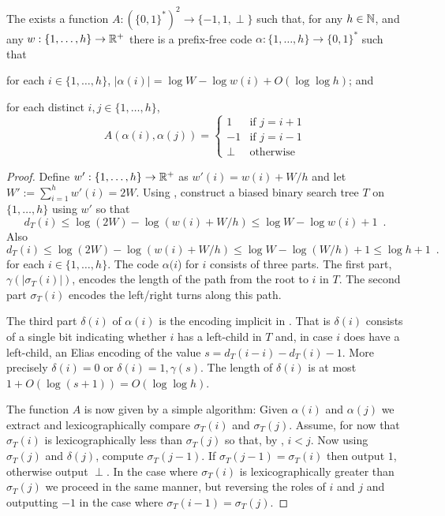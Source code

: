 \documentclass[kpfonts]{patmorin}
\begin{document}
\begin{lem}
  The exists a function $A:(\{0,1\}^*)^2\to\{-1,1,\perp\}$ such that, for any $h\in\mathbb{N}$, and any $w:\{1,\ldots,h\}\to\mathbb{R}^+$ there is a prefix-free code $\alpha:\{1,\ldots,h\}\to \{0,1\}^*$ such that 
  \begin{compactenum}
    \item for each $i\in\{1,\ldots,h\}$, $|\alpha(i)|=\log W -\log w(i) + O(\log\log h)$; and
    \item for each distinct $i,j\in\{1,\ldots,h\}$, 
    \[   A(\alpha(i),\alpha(j)) 
    = \begin{cases}
       1 & \text{if $j=i+1$} \\
       -1 & \text{if $j=i-1$} \\
       \perp & \text{otherwise}
      \end{cases}
      \]
    \end{compactenum}
\end{lem}


\begin{proof}
  Define $w':\{1,\ldots,h\}\to \mathbb{R}^+$ as $w'(i)=w(i)+W/h$ and let $W':=\sum_{i=1}^h w'(i)=2W$.
  Using , construct a biased binary search tree $T$ on $\{1,\ldots,h\}$ using $w'$ so that 
  \[   
    d_T(i)\le\log (2W)-\log(w(i)+W/h) \le \log W-\log w(i)+1 \enspace .
  \]
  Also
  \[
  d_T(i)\le\log (2W)-\log(w(i)+W/h) \le \log W-\log (W/h)+1 \le \log h + 1\enspace .
  \]
  for each $i\in\{1,\ldots,h\}$.  The code $\alpha(i$) for $i$ consists of three parts.  The first part, $\gamma(|\sigma_T(i)|)$, encodes the length of the path from the root to $i$ in $T$. The second part $\sigma_T(i)$ encodes the left/right turns along this path.  
  
  The third part $\delta(i)$ of $\alpha(i)$ is the encoding implicit in .  That is $\delta(i)$ consists of
  a single bit indicating whether $i$ has a left-child in $T$ and, in case $i$ does have a left-child, an Elias encoding of the value $s=d_T(i-i)-d_T(i)-1$.  More precisely $\delta(i)=0$ or $\delta(i)=1,\gamma(s)$.  The length of $\delta(i)$ is at most $1+O(\log(s+1))=O(\log\log h)$.

  The function $A$ is now given by a simple algorithm: Given $\alpha(i)$ and $\alpha(j)$ we extract and lexicographically compare $\sigma_T(i)$ and $\sigma_T(j)$.  Assume, for now that $\sigma_T(i)$ is lexicographically less than $\sigma_T(j)$ so that, by , $i < j$.  Now using $\sigma_T(j)$ and $\delta(j)$, compute $\sigma_T(j-1)$.  If $\sigma_T(j-1)=\sigma_T(i)$ then output $1$, otherwise output $\perp$.
  In the case where $\sigma_T(i)$ is lexicographically greater than $\sigma_T(j)$ we proceed in the same manner, but reversing the roles of $i$ and $j$ and outputting $-1$ in the case where $\sigma_T(i-1)=\sigma_T(j)$.
\end{proof}
\end{document}
